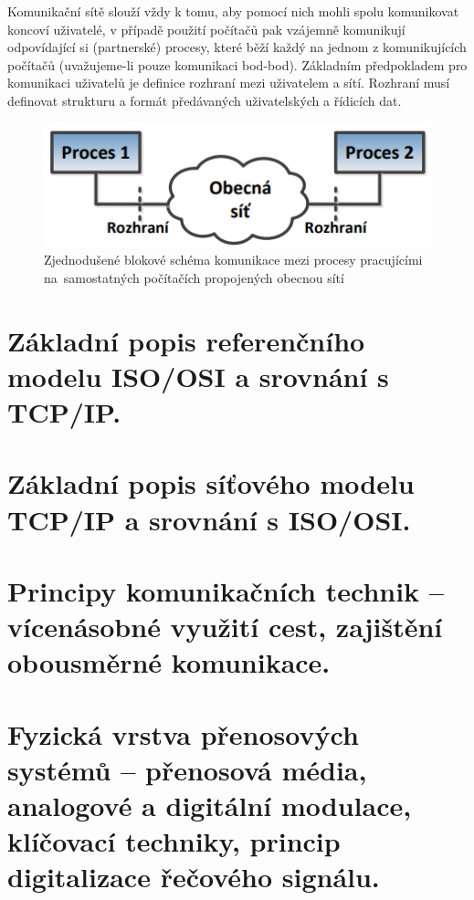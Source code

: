 Komunikační sítě slouží vždy k tomu, aby pomocí nich mohli spolu komunikovat koncoví uživatelé, v
případě použití počítačů pak vzájemně komunikují odpovídající si (partnerské) procesy, které běží
každý na jednom z komunikujících počítačů (uvažujeme-li pouze komunikaci bod-bod). Základním
předpokladem pro komunikaci uživatelů je definice rozhraní mezi uživatelem a sítí. Rozhraní musí
definovat strukturu a formát předávaných uživatelských a řídicích dat.

\begin{figure}[ht]
	\centering
	\includegraphics[width=\textwidth]{images/q01_simplified_scheme_processes}
	\caption{Zjednodušené blokové schéma komunikace mezi procesy pracujícími na~samostatných počítačích propojených obecnou sítí}
	\label{q01_simplified_scheme_processes}
\end{figure}

\clearpage
\section{Základní popis referenčního modelu ISO/OSI a srovnání s TCP/IP.}

\clearpage
\section{Základní popis síťového modelu TCP/IP a srovnání s ISO/OSI.}

\clearpage
\section{Principy komunikačních technik -- vícenásobné využití cest, zajištění obousměrné komunikace.}

\clearpage
\section{Fyzická vrstva přenosových systémů -- přenosová média, analogové a digitální modulace, klíčovací techniky, princip digitalizace řečového signálu.}

